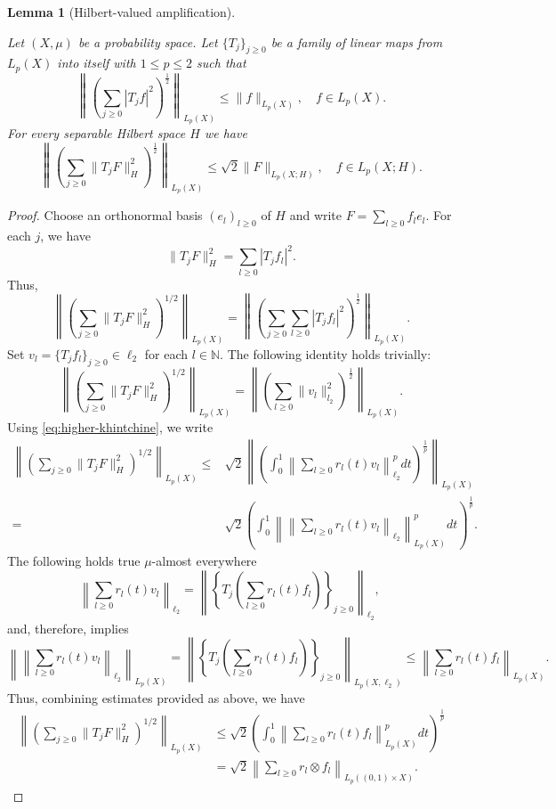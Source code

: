 \documentclass{amsart}
\numberwithin{equation}{section}
\newtheorem{lem}[thm]{Lemma}
\theoremstyle{definition}
\theoremstyle{remark}
\newcommand{\1}{\mathbf 1}
\begin{document}
\begin{lem}[Hilbert-valued amplification]\label{lem:hilbert-amplification}

Let $(X,\mu)$ be a probability space. Let $\{T_{j}\}_{j\geq0}$ be a family of linear maps from $L_p(X)$ into itself with $1\leq p\leq 2$ such that
$$
\left\|\left(\sum_{j\geq0}|T_jf|^2\right)^{\frac12}\right\|_{L_p(X)}\leq\|f\|_{L_p(X)},\quad f\in L_p(X).
$$
For every separable Hilbert space $H$ we have
$$
\left\|\left(\sum_{j\geq0}\|T_jF\|_H^2\right)^{\frac12}\right\|_{L_p(X)}\leq \sqrt{2}\|F\|_{L_p(X;H)},\quad f\in L_p(X;H).
$$
\end{lem}
\begin{proof} Choose an orthonormal basis $(e_l)_{l\geq0}$ of $H$ and write
$F=\sum_{l\geq0}f_le_l.$ 
For each $j$, we have
$$\|T_jF\|_H^2=\sum_{l\geq0}|T_jf_l|^2.$$
Thus,
$$
\left\|\left(\sum_{j\geq0}\|T_jF\|_H^2\right)^{1/2}\right\|_{L_p(X)}=\left\|\left(\sum_{j\geq0}\sum_{l\geq0}|T_jf_l|^2\right)^{\frac12}\right\|_{L_p(X)}.
$$
Set $v_l=\{T_jf_l\}_{j\geq0}\in \ell_{2}$ for each $l\in \mathbb{N}$. The following identity holds trivially:
$$
\left\|\left(\sum_{j\geq0}\|T_jF\|_H^2\right)^{1/2}\right\|_{L_p(X)}=\left\|\left(\sum_{l\geq0}\|v_l\|_{l_2}^2\right)^{\frac12}\right\|_{L_p(X)}.
$$
Using \eqref{eq:higher-khintchine}, we write
\begin{align*}
\left\|\left(\sum_{j\geq0}\|T_jF\|_H^2\right)^{1/2}\right\|_{L_p(X)}\leq&\sqrt{2}\left\|\left(\int_0^1\left\|\sum_{l\geq0}r_l(t)v_l\right\|_{\ell_{2}}^pdt\right)^{\frac1p}\right\|_{L_p(X)}\\
=&\sqrt{2}\left(\int_0^1\left\|\left\|\sum_{l\geq0}r_l(t)v_l\right\|_{\ell_{2}}\right\|_{L_p(X)}^pdt\right)^{\frac1p}.
\end{align*}
The following holds true $\mu$-almost everywhere
$$
\left\|\sum_{l\geq0}r_l(t)v_l\right\|_{\ell_{2}}=\left\|\left\{T_j\left(\sum_{l\geq0}r_l(t)f_l\right)\right\}_{j\geq0}\right\|_{\ell_{2}},\
$$
and, therefore, implies
$$
\left\|\left\|\sum_{l\geq0}r_l(t)v_l\right\|_{\ell_{2}}\right\|_{L_p(X)}=\left\|\left\{T_j\left(\sum_{l\geq0}r_l(t)f_l\right)\right\}_{j\geq0}\right\|_{L_p(X,\ell_2)}\leq\left\|\sum_{l\geq0}r_l(t)f_l\right\|_{L_p(X)}.
$$
Thus, combining estimates provided as above, we have
\begin{equation}\label{Hilbert calculus 1}
\begin{split}
\left\|\left(\sum_{j\geq0}\|T_jF\|_H^2\right)^{1/2}\right\|_{L_p(X)}&\leq \sqrt{2}\left(\int_0^1\left\|\sum_{l\geq0}r_l(t)f_l\right\|_{L_p(X)}^pdt\right)^{\frac{1}{p}}\\
&=\sqrt{2}\left\|\sum_{l\geq0}r_l\otimes f_l\right\|_{L_p((0,1)\times X)}.
\end{split}
\end{equation}


\end{proof}
\end{document}
